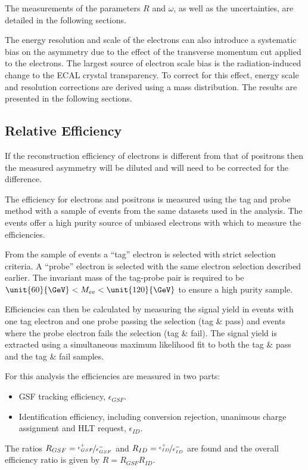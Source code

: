 The measurements of the parameters $R$ and $\omega$, as well as the
uncertainties, are detailed in the following sections.

The energy resolution and scale of the electrons can also introduce a systematic
bias on the asymmetry due to the effect of the transverse momentum cut applied
to the electrons. The largest source of electron scale bias is the
radiation-induced change to the ECAL crystal transparency.  To correct for this
effect, energy scale and resolution corrections are derived using a \Zee mass
distribution. The results are presented in the following sections.

\subsection{Relative Efficiency}

If the reconstruction efficiency of electrons is different from that of
positrons then the measured asymmetry will be diluted and will need to be
corrected for the difference.

The efficiency for electrons and positrons is measured using the tag and probe
method \cite{adam2009tag} with a sample of \Zee events from the same datasets
used in the analysis.  The \Zee events offer a high purity source of unbiased
electrons with which to measure the efficiencies.

From the sample of \Zee events a ``tag'' electron is selected with strict
selection criteria. 
A ``probe'' electron is selected with the same electron selection described
earlier.
The invariant mass of the tag-probe pair is required to be
$\unit{60}{\GeV} < M_{ee} < \unit{120}{\GeV}$ to ensure a high purity sample.

Efficiencies can then be calculated by measuring the signal yield in events
with one tag electron and one probe passing the selection (tag \& pass) and
events where the probe electron fails the selection (tag \& fail).
The signal yield is extracted using a simultaneous maximum likelihood fit to
both the tag \& pass and the tag \& fail samples.

For this analysis the efficiencies are measured in two parts:

\begin{itemize}
    \item GSF tracking efficiency, $\epsilon_{GSF}$.
    \item Identification efficiency, including conversion rejection, unanimous
charge assignment and HLT request, $\epsilon_{ID}$.
\end{itemize}
The ratios $R_{GSF} = \nicefrac{\epsilon^{+}_{GSF}}{\epsilon^{-}_{GSF}}$ and
$R_{ID} = \nicefrac{\epsilon^{+}_{ID}}{\epsilon^{-}_{ID}}$ are found and the
overall efficiency ratio is given by $R = R_{GSF} R_{ID}$.


